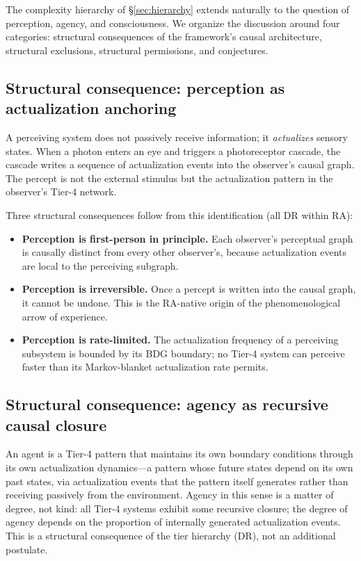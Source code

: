 \documentclass[11pt]{article}
\begin{document}
The complexity hierarchy of \S\ref{sec:hierarchy} extends naturally to the question of perception, agency, and consciousness. We organize the discussion around four categories: structural consequences of the framework's causal architecture, structural exclusions, structural permissions, and conjectures.

\subsection{Structural consequence: perception as actualization anchoring}

A perceiving system does not passively receive information; it \emph{actualizes} sensory states. When a photon enters an eye and triggers a photoreceptor cascade, the cascade writes a sequence of actualization events into the observer's causal graph. The percept is not the external stimulus but the actualization pattern in the observer's Tier-4 network.

Three structural consequences follow from this identification (all DR within RA):
\begin{itemize}[nosep]
\item \textbf{Perception is first-person in principle.} Each observer's perceptual graph is causally distinct from every other observer's, because actualization events are local to the perceiving subgraph.
\item \textbf{Perception is irreversible.} Once a percept is written into the causal graph, it cannot be undone. This is the RA-native origin of the phenomenological arrow of experience.
\item \textbf{Perception is rate-limited.} The actualization frequency of a perceiving subsystem is bounded by its BDG boundary; no Tier-4 system can perceive faster than its Markov-blanket actualization rate permits.
\end{itemize}

\subsection{Structural consequence: agency as recursive causal closure}

An agent is a Tier-4 pattern that maintains its own boundary conditions through its own actualization dynamics---a pattern whose future states depend on its own past states, via actualization events that the pattern itself generates rather than receiving passively from the environment. Agency in this sense is a matter of degree, not kind: all Tier-4 systems exhibit some recursive closure; the degree of agency depends on the proportion of internally generated actualization events. This is a structural consequence of the tier hierarchy (DR), not an additional postulate.
\end{document}
